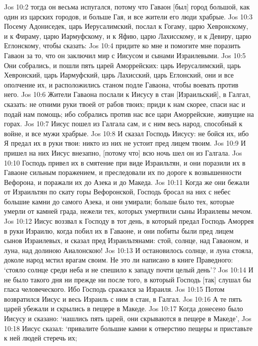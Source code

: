 Jos 10:2  тогда он весьма испугался, потому что Гаваон [был] город большой, как один из царских городов, и больше Гая, и все жители его люди храбрые.
Jos 10:3  Посему Адониседек, царь Иерусалимский, послал к Гогаму, царю Хевронскому, и к Фираму, царю Иармуфскому, и к Яфию, царю Лахисскому, и к Девиру, царю Еглонскому, чтобы сказать:
Jos 10:4  придите ко мне и помогите мне поразить Гаваон за то, что он заключил мир с Иисусом и сынами Израилевыми.
Jos 10:5  Они собрались, и пошли пять царей Аморрейских: царь Иерусалимский, царь Хевронский, царь Иармуфский, царь Лахисский, царь Еглонский, они и все ополчение их, и расположились станом подле Гаваона, чтобы воевать против него.
Jos 10:6  Жители Гаваона послали к Иисусу в стан [Израильский], в Галгал, сказать: не отними руки твоей от рабов твоих; приди к нам скорее, спаси нас и подай нам помощь; ибо собрались против нас все цари Аморрейские, живущие на горах.
Jos 10:7  Иисус пошел из Галгала сам, и с ним весь народ, способный к войне, и все мужи храбрые.
Jos 10:8  И сказал Господь Иисусу: не бойся их, ибо Я предал их в руки твои: никто из них не устоит пред лицем твоим.
Jos 10:9  И пришел на них Иисус внезапно, [потому что] всю ночь шел он из Галгала.
Jos 10:10  Господь привел их в смятение при виде Израильтян, и они поразили их в Гаваоне сильным поражением, и преследовали их по дороге к возвышенности Вефорона, и поражали их до Азека и до Македа.
Jos 10:11  Когда же они бежали от Израильтян по скату горы Вефоронской, Господь бросал на них с небес большие камни до самого Азека, и они умирали; больше было тех, которые умерли от камней града, нежели тех, которых умертвили сыны Израилевы мечом.
Jos 10:12  Иисус воззвал к Господу в тот день, в который предал Господь Аморрея в руки Израилю, когда побил их в Гаваоне, и они побиты были пред лицем сынов Израилевых, и сказал пред Израильтянами: стой, солнце, над Гаваоном, и луна, над долиною Аиалонскою!
Jos 10:13  И остановилось солнце, и луна стояла, доколе народ мстил врагам своим. Не это ли написано в книге Праведного: `стояло солнце среди неба и не спешило к западу почти целый день'?
Jos 10:14  И не было такого дня ни прежде ни после того, в который Господь [так] слушал бы гласа человеческого. Ибо Господь сражался за Израиля.
Jos 10:15  Потом возвратился Иисус и весь Израиль с ним в стан, в Галгал.
Jos 10:16  А те пять царей убежали и скрылись в пещере в Македе.
Jos 10:17  Когда донесено было Иисусу и сказано: `нашлись пять царей, они скрываются в пещере в Македе',
Jos 10:18  Иисус сказал: `привалите большие камни к отверстию пещеры и приставьте к ней людей стеречь их;
